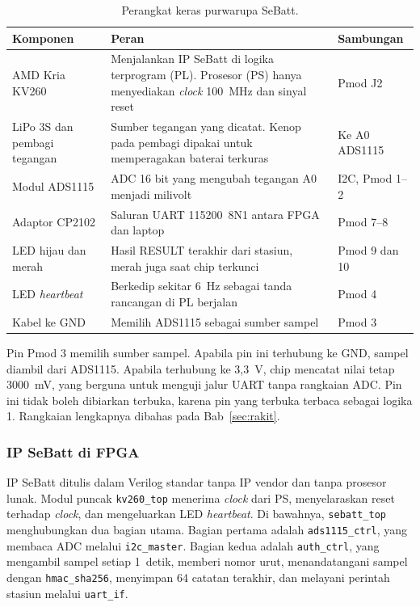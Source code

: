 \documentclass[11pt,a4paper]{article}
\begin{document}
\begin{table}[H]
  \centering
  \small
  \begin{tabularx}{\textwidth}{l X l}
    \toprule
    Komponen & Peran & Sambungan \\
    \midrule
    AMD Kria KV260 & Menjalankan IP SeBatt di logika terprogram (PL). Prosesor (PS) hanya
      menyediakan \textit{clock} 100~MHz dan sinyal reset & Pmod J2 \\
    LiPo 3S dan pembagi tegangan & Sumber tegangan yang dicatat. Kenop pada pembagi dipakai untuk
      memperagakan baterai terkuras & Ke A0 ADS1115 \\
    Modul ADS1115 & ADC 16 bit yang mengubah tegangan A0 menjadi milivolt & I2C, Pmod 1--2 \\
    Adaptor CP2102 & Saluran UART 115200~8N1 antara FPGA dan laptop & Pmod 7--8 \\
    LED hijau dan merah & Hasil RESULT terakhir dari stasiun, merah juga saat chip terkunci
      & Pmod 9 dan 10 \\
    LED \textit{heartbeat} & Berkedip sekitar 6~Hz sebagai tanda rancangan di PL berjalan & Pmod 4 \\
    Kabel ke GND & Memilih ADS1115 sebagai sumber sampel & Pmod 3 \\
    \bottomrule
  \end{tabularx}
  \caption{Perangkat keras purwarupa SeBatt.}
  \label{tab:perangkat}
\end{table}

Pin Pmod 3 memilih sumber sampel. Apabila pin ini terhubung ke GND, sampel diambil dari
ADS1115. Apabila terhubung ke 3,3~V, chip mencatat nilai tetap 3000~mV, yang berguna untuk
menguji jalur UART tanpa rangkaian ADC. Pin ini tidak boleh dibiarkan terbuka, karena pin yang
terbuka terbaca sebagai logika 1. Rangkaian lengkapnya dibahas pada Bab~\ref{sec:rakit}.

\subsubsection*{IP SeBatt di FPGA}

IP SeBatt ditulis dalam Verilog standar tanpa IP vendor dan tanpa prosesor lunak. Modul puncak
\texttt{kv260\_top} menerima \textit{clock} dari PS, menyelaraskan reset terhadap
\textit{clock}, dan mengeluarkan LED \textit{heartbeat}. Di bawahnya, \texttt{sebatt\_top}
menghubungkan dua bagian utama. Bagian pertama adalah \texttt{ads1115\_ctrl}, yang membaca ADC
melalui \texttt{i2c\_master}. Bagian kedua adalah \texttt{auth\_ctrl}, yang mengambil sampel
setiap 1~detik, memberi nomor urut, menandatangani sampel dengan \texttt{hmac\_sha256}, menyimpan
64 catatan terakhir, dan melayani perintah stasiun melalui \texttt{uart\_if}.
\end{document}
